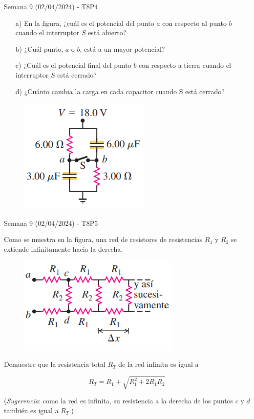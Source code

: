 \begin{frame}{Semana 9 (02/04/2024) - T8P4}

    \begin{itemize}
        \item[a)] En la figura, ¿cuál es el potencial del punto $a$ con respecto al punto $b$
cuando el interruptor $S$ está abierto?
        \item[b)] ¿Cuál punto, $a$ o $b$, está a un mayor
potencial?
        \item[c)] ¿Cuál es el potencial final
del punto $b$ con respecto a tierra cuando
el interruptor $S$ está cerrado?
        \item[d)] ¿Cuánto cambia la carga en cada capacitor
cuando S está cerrado?
    \end{itemize}

    \begin{figure}
    \centering
    \includegraphics[scale=0.6]{figures/t8p4.png}
    \end{figure}

    
\end{frame}

\begin{frame}{Semana 9 (02/04/2024) - T8P5}
    
    Como se muestra en la figura, una red de resistores de resistencias $R_1$ y $R_2$ se extiende infinitamente hacia la derecha.
    
    \begin{figure}
    \centering
    \includegraphics[scale=0.6]{figures/t8p5.png}
    \end{figure}
    
    Demuestre que la resistencia total $R_T$ de la red infinita es igual a

    \begin{equation}
        R_T=R_1+\sqrt{R_1^2+2R_1R_2}
    \end{equation}
    
    (\textit{Sugerencia}: como la red es infinita, su resistencia a la derecha de los puntos $c$ y $d$ también es igual a $R_T$.)
    
\end{frame}

